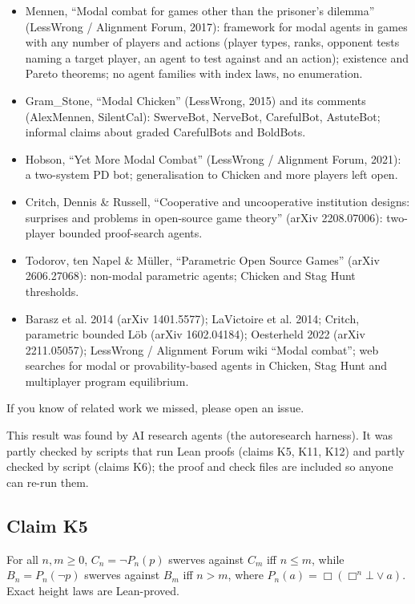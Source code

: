 \documentclass{article}
\begin{document}
\begin{itemize}
\item Mennen, ``Modal combat for games other than the prisoner's dilemma'' (LessWrong / Alignment Forum, 2017): framework for modal agents in games with any number of players and actions (player types, ranks, opponent tests naming a target player, an agent to test against and an action); existence and Pareto theorems; no agent families with index laws, no enumeration.
\item Gram\_Stone, ``Modal Chicken'' (LessWrong, 2015) and its comments (AlexMennen, SilentCal): SwerveBot, NerveBot, CarefulBot, AstuteBot; informal claims about graded CarefulBots and BoldBots.
\item Hobson, ``Yet More Modal Combat'' (LessWrong / Alignment Forum, 2021): a two-system PD bot; generalisation to Chicken and more players left open.
\item Critch, Dennis \& Russell, ``Cooperative and uncooperative institution designs: surprises and problems in open-source game theory'' (arXiv 2208.07006): two-player bounded proof-search agents.
\item Todorov, ten Napel \& Müller, ``Parametric Open Source Games'' (arXiv 2606.27068): non-modal parametric agents; Chicken and Stag Hunt thresholds.
\item Barasz et al. 2014 (arXiv 1401.5577); LaVictoire et al. 2014; Critch, parametric bounded Löb (arXiv 1602.04184); Oesterheld 2022 (arXiv 2211.05057); LessWrong / Alignment Forum wiki ``Modal combat''; web searches for modal or provability-based agents in Chicken, Stag Hunt and multiplayer program equilibrium.
\end{itemize}

If you know of related work we missed, please open an issue.

This result was found by AI research agents (the autoresearch harness). It was partly checked by scripts that run Lean proofs (claims K5, K11, K12) and partly checked by script (claims K6); the proof and check files are included so anyone can re-run them.

\subsection*{Claim K5}

For all $n,m\ge0$, $C_n=\neg P_n(p)$ swerves against $C_m$ iff $n\le m$, while $B_n=P_n(\neg p)$ swerves against $B_m$ iff $n>m$, where $P_n(a)=\Box(\Box^n\bot\lor a)$. Exact height laws are Lean-proved.
\end{document}
